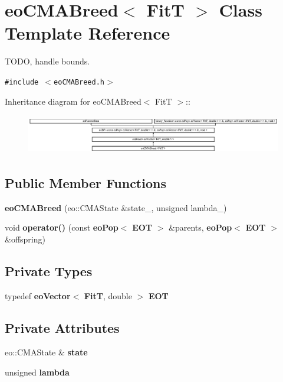 \section{eo\-CMABreed$<$ Fit\-T $>$ Class Template Reference}
\label{classeo_c_m_a_breed}
TODO, handle bounds.  


{\tt \#include $<$eo\-CMABreed.h$>$}

Inheritance diagram for eo\-CMABreed$<$ Fit\-T $>$::\begin{figure}[H]
\begin{center}
\leavevmode
\includegraphics[height=1.73643cm]{classeo_c_m_a_breed}
\end{center}
\end{figure}
\subsection*{Public Member Functions}
\begin{CompactItemize}
\item 
{\bf eo\-CMABreed} (eo::CMAState \&state\_\-, unsigned lambda\_\-)\label{classeo_c_m_a_breed_a0}

\item 
void {\bf operator()} (const {\bf eo\-Pop}$<$ {\bf EOT} $>$ \&parents, {\bf eo\-Pop}$<$ {\bf EOT} $>$ \&offspring)\label{classeo_c_m_a_breed_a1}

\end{CompactItemize}
\subsection*{Private Types}
\begin{CompactItemize}
\item 
typedef {\bf eo\-Vector}$<$ {\bf Fit\-T}, double $>$ {\bf EOT}\label{classeo_c_m_a_breed_y0}

\end{CompactItemize}
\subsection*{Private Attributes}
\begin{CompactItemize}
\item 
eo::CMAState \& {\bf state}\label{classeo_c_m_a_breed_r0}

\item 
unsigned {\bf lambda}\label{classeo_c_m_a_breed_r1}

\end{CompactItemize}


